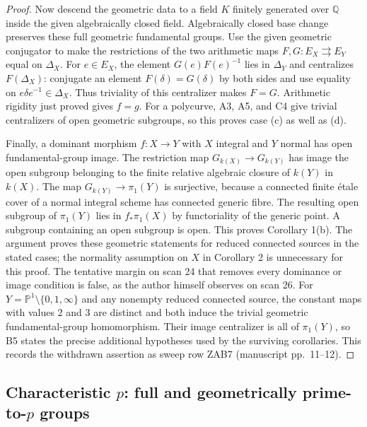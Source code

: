 \begin{proof}
Now descend the geometric data to a field $K$ finitely generated over
$\mathbb Q$ inside the given algebraically closed field. Algebraically
closed base change preserves these full geometric fundamental groups.
Use the given geometric conjugator to make the restrictions of the
two arithmetic maps $F,G:E_X\rightrightarrows E_Y$ equal on
$\Delta_X$. For $e\in E_X$, the element $G(e)F(e)^{-1}$ lies in
$\Delta_Y$ and centralizes $F(\Delta_X)$: conjugate an element
$F(\delta)=G(\delta)$ by both sides and use equality on
$e\delta e^{-1}\in\Delta_X$. Thus triviality of this centralizer
makes $F=G$. Arithmetic rigidity just proved gives $f=g$.
For a polycurve, A3, A5, and C4 give trivial centralizers of open
geometric subgroups, so this proves case (c) as well as (d).

Finally, a dominant morphism $f:X\to Y$ with $X$ integral and
$Y$ normal has open fundamental-group image. The restriction map
$G_{k(X)}\to G_{k(Y)}$ has image the open subgroup belonging to the
finite relative algebraic closure of $k(Y)$ in $k(X)$. The map
$G_{k(Y)}\to\pi_1(Y)$ is surjective, because a connected finite
\'etale cover of a normal integral scheme has connected generic
fibre. The resulting open subgroup of $\pi_1(Y)$ lies in
$f_*\pi_1(X)$ by functoriality of the generic point. A subgroup
containing an open subgroup is open. This proves Corollary 1(b).
The argument proves these geometric statements for reduced
connected sources in the stated cases; the normality assumption
on $X$ in Corollary 2 is unnecessary for this proof.
The tentative margin on scan 24 that removes every dominance or image
condition is false, as the author himself observes on scan 26.
For $Y=\mathbb P^1\setminus\{0,1,\infty\}$ and any nonempty reduced
connected source, the constant maps with values $2$ and $3$ are distinct
and both induce the trivial geometric fundamental-group homomorphism.
Their image centralizer is all of $\pi_1(Y)$, so B5 states the precise
additional hypotheses used by the surviving corollaries. This records
the withdrawn assertion as sweep row ZAB7 (manuscript pp.~11--12).
\end{proof}

\subsection{\texorpdfstring{Characteristic $p$: full and geometrically prime-to-$p$ groups}{Characteristic p: full and geometrically prime-to-p groups}}

